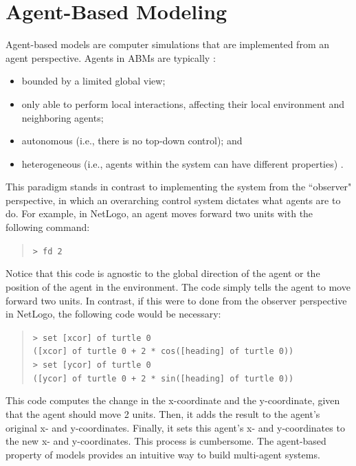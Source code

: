 \section{Agent-Based Modeling}
\label{sec:abm}
Agent-based models are computer simulations that are implemented from an agent perspective.
Agents in ABMs are typically \cite{epstein1999agent}:
\begin{itemize}
   \item bounded by a limited global view;
   \item only able to perform local interactions, affecting their local environment and neighboring agents;
   \item autonomous (i.e., there is no top-down control); and
   \item heterogeneous (i.e., agents within the system can have different properties) .
\end{itemize}
This paradigm stands in contrast to implementing the system from the ``observer" perspective, in which an overarching control system dictates what agents are to do.
For example, in NetLogo, an agent moves forward two units with the following command:
\begin{quote}
\texttt{\small > fd 2}
\end{quote}
Notice that this code is agnostic to the global direction of the agent or the position of the agent in the environment.
The code simply tells the agent to move forward two units.
In contrast, if this were to done from the observer perspective in NetLogo, the following code would be necessary:
\begin{quote}
\texttt{\small > set [xcor] of turtle 0\\
([xcor] of turtle 0 + 2 * cos([heading] of turtle 0))\\
> set [ycor] of turtle 0\\
([ycor] of turtle 0 + 2 * sin([heading] of turtle 0))}
\end{quote}
This code computes the change in the x-coordinate and the y-coordinate, given that the agent should move 2 units.
Then, it adds the result to the agent's original x- and y-coordinates.
Finally, it sets this agent's x- and y-coordinates to the new x- and y-coordinates.
This process is cumbersome.
The agent-based property of models provides an intuitive way to build multi-agent systems.

